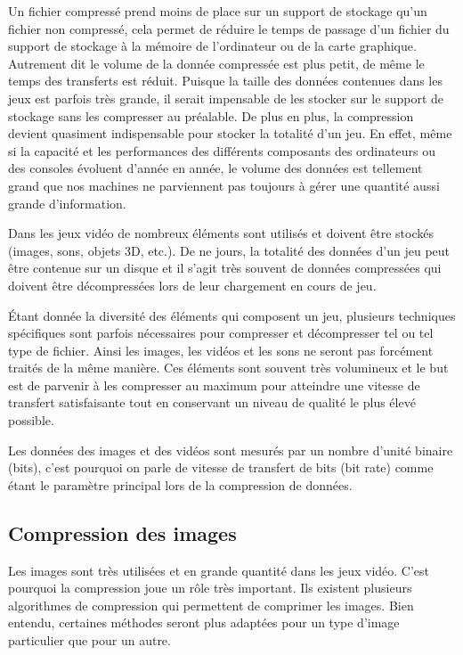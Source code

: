 \documentclass[a4paper, 11pt]{article} %
\begin{document}
Un fichier compressé prend moins de place sur un support de stockage qu'un fichier non compressé, cela permet de réduire le temps de passage d'un fichier du support de stockage à la mémoire de l'ordinateur ou de la carte graphique. Autrement dit le volume de la donnée compressée est plus petit, de même le temps des transferts est réduit. Puisque la taille des données contenues dans les jeux est parfois très grande, il serait impensable de les stocker sur le support de stockage sans les compresser au préalable. De plus en plus, la compression devient quasiment indispensable pour stocker la totalité d'un jeu. En effet, même si la capacité et les performances des différents composants des ordinateurs ou des consoles évoluent d'année en année, le volume des données est tellement grand que nos machines ne parviennent pas toujours à gérer une quantité aussi grande d'information.

Dans les jeux vidéo de nombreux éléments sont utilisés et doivent être stockés (images, sons, objets 3D, etc.). De ne jours, la totalité des données d'un jeu peut être contenue sur un disque et il s'agit très souvent de données compressées qui doivent être décompressées lors de leur chargement en cours de jeu.

Étant donnée la diversité des éléments qui composent un jeu, plusieurs techniques spécifiques sont parfois nécessaires pour compresser et décompresser tel ou tel type de fichier. Ainsi les images, les vidéos et les sons ne seront pas forcément traités de la même manière. Ces éléments sont souvent très volumineux et le but est de parvenir à les compresser au maximum pour atteindre une vitesse de transfert satisfaisante tout en conservant un niveau de qualité le plus élevé possible. 

Les données des images et des vidéos sont mesurés par un nombre d'unité binaire (bits), c'est pourquoi on parle de vitesse de transfert de bits (bit rate) comme étant le paramètre principal lors de la compression de données. 

\newpage
\subsection{Compression des images}
Les images sont très utilisées et en grande quantité dans les jeux vidéo. C'est pourquoi la compression joue un rôle très important. Ils existent plusieurs algorithmes de compression qui permettent de comprimer les images. Bien entendu, certaines méthodes seront plus adaptées pour un type d'image particulier que pour un autre. 
\end{document}
